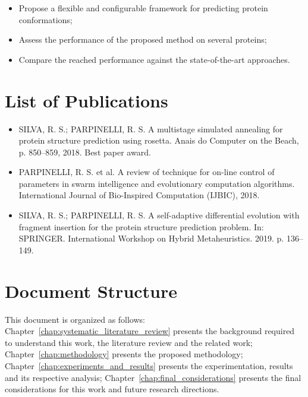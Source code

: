 \begin{itemize}
    \item Propose a flexible and configurable framework for predicting protein conformations;
    \item Assess the performance of the proposed method on several proteins;
    \item Compare the reached performance against the state-of-the-art approaches.
\end{itemize}


\section{List of Publications}\label{sec:list_of_publications}

\begin{itemize}
    \item SILVA, R. S.; PARPINELLI, R. S. A multistage simulated annealing for protein structure prediction using rosetta. Anais do Computer on the Beach, p. 850–859, 2018. Best paper award.
    \item PARPINELLI, R. S. et al. A review of technique for on-line control of parameters in swarm intelligence and evolutionary computation algorithms. International Journal of Bio-Inspired Computation (IJBIC), 2018.
    \item SILVA, R. S.; PARPINELLI, R. S. A self-adaptive differential evolution with fragment insertion  for  the  protein  structure  prediction  problem.  In:  SPRINGER. International Workshop on Hybrid Metaheuristics. 2019. p. 136–149.
\end{itemize}

\section{Document Structure} \label{sec:chap1_document_structure}

This document is organized as follows:
Chapter~\ref{chap:systematic_literature_review} presents the background
required to understand this work, the literature review and the related work;
Chapter~\ref{chap:methodology} presents the proposed methodology;
Chapter~\ref{chap:experiments_and_results} presents the experimentation,
results and its respective analysis;
Chapter~\ref{chap:final_considerations} presents the final considerations for
this work and future research directions.

